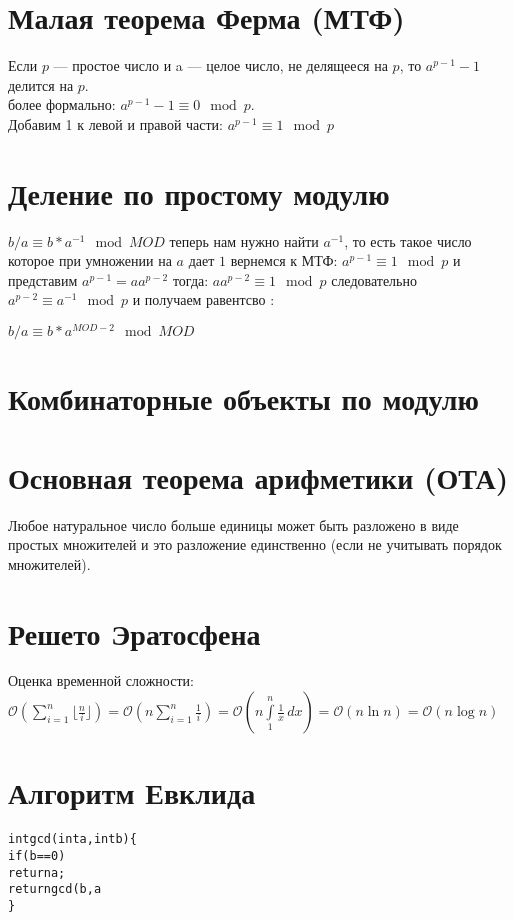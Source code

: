 \documentclass[12pt]{article}
\begin{document}
    \section{Малая теорема Ферма (МТФ)}
    Если $p$ — простое число и a — целое число, не делящееся на $p$, то $a^{p-1}-1$ делится на $p$.
    \\
    более формально: $a^{p - 1} - 1 \equiv 0 \mod p$.
    \\
    Добавим 1 к левой и правой части: $a^{p - 1} \equiv 1 \mod p$
    
    \section{Деление по простому модулю}
    $b / a  \equiv b * a ^ {-1} \mod MOD$
    теперь нам нужно найти $a^{-1}$, то есть такое число которое при умножении на $a$ дает $1$
    вернемся к МТФ: $a^{p - 1} \equiv 1 \mod p$ и представим $a^{p - 1} = aa^{p - 2}$ тогда:
    $aa^{p - 2} \equiv 1 \mod p$ следовательно $a^{p-2} \equiv a^{-1} \mod p $
    и получаем равентсво : 
    
    \begin{center}
        $b / a \equiv b * a^{MOD - 2} \mod MOD $
    \end{center}
    
    \section{Комбинаторные объекты по модулю}
    \section{Основная теорема арифметики (ОТА)}
    Любое натуральное число больше единицы может быть разложено в виде простых множителей и это разложение единственно (если не учитывать порядок множителей).
    \section{Решето Эратосфена}
    
    Оценка временной сложности:
    \\
    $\mathcal{O}(\sum\limits_{i=1}^n\lfloor \frac{n}{i} \rfloor) = \mathcal{O}(n\sum\limits_{i=1}^n \frac{1}{i})  =  \mathcal{O}(n \int\limits_{1}^n \frac{1}{x}\,dx) = \mathcal{O}(n \ln n) = \mathcal{O}(n \log n)$
    
    \section{Алгоритм Евклида}
        \begin{alltt}
int gcd(int a, int b) \{
    if (b == 0)
        return a;
    return gcd(b, a % b);
\}
    \end{alltt}
\end{document}
